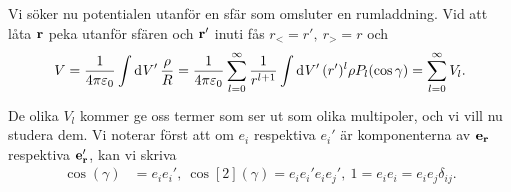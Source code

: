 Vi söker nu potentialen utanför en sfär som omsluter en rumladdning. Vid att låta $\vb{r}$ peka utanför sfären och $\vb{r}'$ inuti fås $r_{<} = r',\ r_{>} = r$ och
\begin{align*}
	V = \frac{1}{4\pi\varepsilon_{0}}\int\limits_{}^{}\dd[]{V'}\frac{\rho}{R} = \frac{1}{4\pi\varepsilon_{0}}\sum\limits_{l = 0}^{\infty}\frac{1}{r^{l + 1}}\int\limits_{}^{}\dd[]{V'}(r')^{l}\rho P_{l}(\cos{\gamma}) = \sum\limits_{l = 0}^{\infty}V_{l}.
\end{align*}
De olika $V_{l}$ kommer ge oss termer som ser ut som olika multipoler, och vi vill nu studera dem. Vi noterar först att om $e_{i}$ respektiva $e_{i}'$ är komponenterna av $\vb{e}_{\vb{r}}$ respektiva $\vb{e}_{\vb{r}}'$, kan vi skriva
\begin{align*}
	\cos(\gamma) &= e_{i}e_{i}',\ \cos[2](\gamma) = e_{i}e_{i}'e_{i}e_{j}',\ 1 = e_{i}e_{i} = e_{i}e_{j}\delta_{ij}.
\end{align*}

